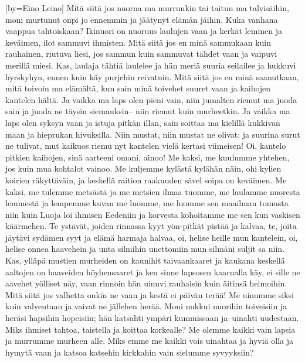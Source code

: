 [by={Eino Leino}]
\beginverse
Mitä siitä jos nuorna ma murrunkin
tai taitun ma talvisäihin,
moni murtunut onpi jo ennemmin
ja jäätynyt elämän jäihin.
Kuka vanhana vaappua tahtoiskaan?
Ikinuori on nuoruus laulujen vaan
ja kerkät lemmen ja keväimen,
ilot sammuvi ihmisten.
\endverse
\beginverse
Mitä siitä jos en minä sammukaan
kuin rauhainen, riutuva liesi,
jos sammun kuin sammuvat tähdet vaan
ja vaipuvi merillä miesi.
Kas, laulaja tähtiä laulelee
ja hän meriä suuria seilailee
ja hukkuvi hyrskyhyn, ennen kuin
käy purjehin reivatuin.
\endverse
\beginverse
Mitä siitä jos en minä saanutkaan,
mitä toivoin ma elämältä,
kun sain minä toivehet suuret vaan
ja kaihojen kantelen hältä.
Ja vaikka ma laps olen pieni vain,
niin jumalten riemut ma juoda sain
ja juoda ne täysin siemauksin--
niin riemut kuin murheetkin.
\endverse
\beginverse
Ja vaikka ma laps olen syksyn vaan
ja istuja pitkän illan,
sain soittaa ma kielillä kukkivan maan
ja hieprukan hivuksilla.
Niin mustat, niin mustat ne olivat;
ja suurina surut ne tulivat,
mut kaikuos riemu nyt kantelen
vielä kertasi viimeisen!
\endverse
\beginverse
Oi, kantelo pitkien kaihojen,
sinä aarteeni omani, ainoo!
Me kaksi, me kuulumme yhtehen,
jos kuin mua kohtalot vainoo.
Me kuljemme kylästä kylähän näin,
ohi kylien koirien räkyttäväin,
ja keskellä raition raakuuden
sävel soipa on keväimen.
\endverse
\beginverse
Me kaksi, me tulemme metsästä
ja me metsien ilmaa tuomme,
me laulamme nuoresta lemmestä
ja lempemme kuvan me luomme,
me luomme sen maailman tomusta niin
kuin Luoja loi ihmisen Eedeniin
ja korvesta kohoitamme me sen
kun vaskisen käärmehen.
\endverse
\beginverse
Te ystävät, joiden rinnassa kyyt
yön-pitkät pistää ja kalvaa,
te, joita jäytävi sydämen syyt
ja elämä harmaja halvaa,
oi, helise heille mun kantelein,
oi, helise onnea haavehein
ja unta silmihin unettomiin
mun silmäni suljit sa niin.
Kas, ylläpä mustien murheiden
on kaunihit taivaankaaret
ja kaukana keskellä aaltojen
on haaveiden höyhensaaret
ja ken sinne lapsosen kaarnalla käy,
ei sille ne aavehet yölliset näy,
vaan rinnoin hän uinuvi rauhaisin
kuin äitinsä helmoihin.
\endverse
\beginverse
Mitä siitä jos valhetta onkin ne vaan
ja kestä ei päivän terää!
Me uinumme siksi kuin valveutaan
ja vaivat ne jällehen herää.
Moni nukkui nuorihin toiveisiin
ja heräsi hapsihin hopeisiin;
hän katsahti ympäri kummissaan
ja--uinahti uudestaan.
Miks ihmiset tahtoa, taistella
ja koittaa korkealle?
Me olemme kaikki vain lapsia
ja murrumme murheen alle.
Miks emme me kaikki vois uinahtaa
ja hyviä olla ja hymytä vaan
ja katsoa katsehin kirkkahin
vain sielumme syvyyksiin?
